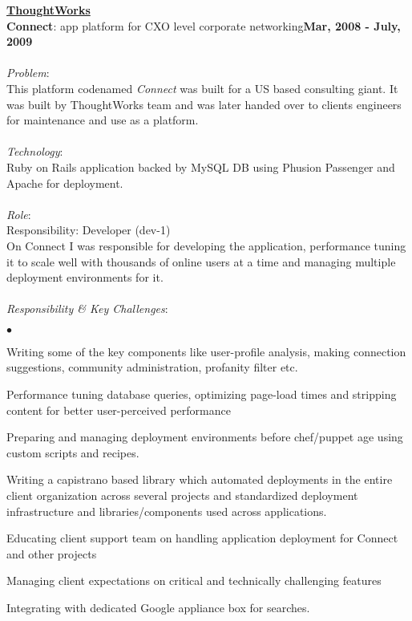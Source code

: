 \documentclass[margin,line]{res}
\newenvironment{list2}{
  \begin{list}{$\bullet$}{%
      \setlength{\itemsep}{0in}
      \setlength{\parsep}{0in} \setlength{\parskip}{0in}
      \setlength{\topsep}{0in} \setlength{\partopsep}{0in} 
      \setlength{\leftmargin}{0.2in}}}{\end{list}}
\begin{document}
\begin{resume}
{\underline {\bf ThoughtWorks}}\\
\vspace{-.1cm}
{\bf Connect}: app platform for CXO level corporate networking\hfill {\bf Mar, 2008 - July, 2009}\\
\vspace{-.2cm}\\
{\em Problem}:\\
This platform codenamed {\em Connect} was built for a US based consulting giant. It was built by ThoughtWorks team and was later handed over to clients engineers for maintenance and use as a platform.\\
\\
{\em Technology}:\\
Ruby on Rails application backed by MySQL DB using Phusion Passenger and Apache for deployment.\\
\\
{\em Role}: \\
Responsibility: Developer (dev-1)\\
On Connect I was responsible for developing the application, performance tuning it to scale well with thousands of online users at a time and managing multiple deployment environments for it.\\
\\
{\em Responsibility \& Key Challenges}:
\vspace*{.05in}  
\begin{list2}
\item Writing some of the key components like user-profile analysis, making connection suggestions, community administration, profanity filter etc.
\item Performance tuning database queries, optimizing page-load times and stripping content for better user-perceived performance
\item Preparing and managing deployment environments before chef/puppet age using custom scripts and recipes. 
\item Writing a capistrano based library which automated deployments in the entire client organization across several projects and standardized deployment infrastructure and libraries/components used across applications.
\item Educating client support team on handling application deployment for Connect and other projects 
\item Managing client expectations on critical and technically challenging features
\item Integrating with dedicated Google appliance box for searches.
\end{list2}


\end{resume}
\end{document}
